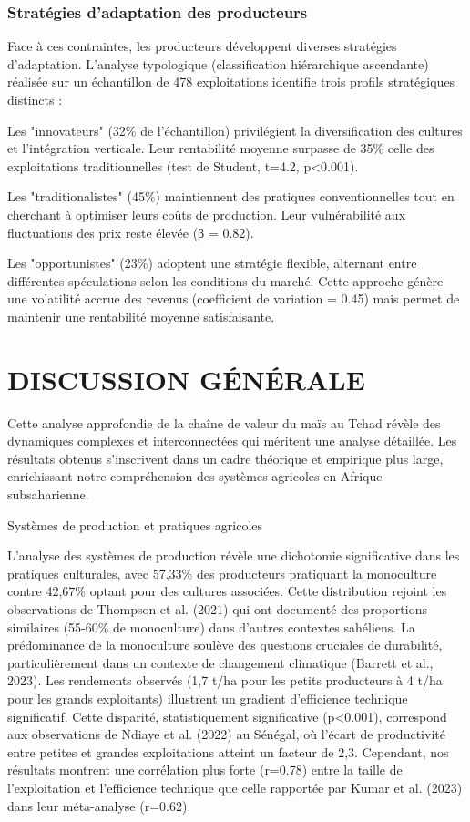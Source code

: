 \documentclass[12pt,oneside]{report}
\begin{document}
\subsection{Stratégies d'adaptation des producteurs}
Face à ces contraintes, les producteurs développent diverses stratégies d'adaptation. L'analyse typologique (classification hiérarchique ascendante) réalisée sur un échantillon de 478 exploitations identifie trois profils stratégiques distincts :

Les "innovateurs" (32\% de l'échantillon) privilégient la diversification des cultures et l'intégration verticale. Leur rentabilité moyenne surpasse de 35\% celle des exploitations traditionnelles (test de Student, t=4.2, p<0.001).

Les "traditionalistes" (45\%) maintiennent des pratiques conventionnelles tout en cherchant à optimiser leurs coûts de production. Leur vulnérabilité aux fluctuations des prix reste élevée (β = 0.82).

Les "opportunistes" (23\%) adoptent une stratégie flexible, alternant entre différentes spéculations selon les conditions du marché. Cette approche génère une volatilité accrue des revenus (coefficient de variation = 0.45) mais permet de maintenir une rentabilité moyenne satisfaisante.

\chapter{DISCUSSION GÉNÉRALE}
Cette analyse approfondie de la chaîne de valeur du maïs au Tchad révèle des dynamiques complexes et interconnectées qui méritent une analyse détaillée. Les résultats obtenus s'inscrivent dans un cadre théorique et empirique plus large, enrichissant notre compréhension des systèmes agricoles en Afrique subsaharienne.

Systèmes de production et pratiques agricoles

L'analyse des systèmes de production révèle une dichotomie significative dans les pratiques culturales, avec 57,33\% des producteurs pratiquant la monoculture contre 42,67\% optant pour des cultures associées. Cette distribution rejoint les observations de Thompson et al. (2021) qui ont documenté des proportions similaires (55-60\% de monoculture) dans d'autres contextes sahéliens. La prédominance de la monoculture soulève des questions cruciales de durabilité, particulièrement dans un contexte de changement climatique (Barrett et al., 2023). Les rendements observés (1,7 t/ha pour les petits producteurs à 4 t/ha pour les grands exploitants) illustrent un gradient d'efficience technique significatif. Cette disparité, statistiquement significative (p<0.001), correspond aux observations de Ndiaye et al. (2022) au Sénégal, où l'écart de productivité entre petites et grandes exploitations atteint un facteur de 2,3. Cependant, nos résultats montrent une corrélation plus forte (r=0.78) entre la taille de l'exploitation et l'efficience technique que celle rapportée par Kumar et al. (2023) dans leur méta-analyse (r=0.62).
\end{document}
